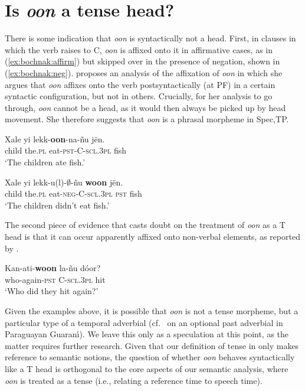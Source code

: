 \documentclass[output=paper,newtxmath,modfonts,nonflat,draftmode]{langsci/langscibook}
\begin{document}
\section{Is \textit{oon} a tense head?}\label{sec:bochnak:5}

There is some indication that \textit{oon} is syntactically not a
head. First, in clauses in which the verb raises to C, \textit{oon} is
affixed onto it in affirmative cases, as in (\ref{ex:bochnak:affirm}) but skipped over in the presence
of negation, shown in (\ref{ex:bochnak:neg}). \cite{Martinovic2015b, Martinovic2016a} proposes an
analysis of the affixation of \textit{oon} in which she argues that
\textit{oon} affixes onto
the verb postsyntactically (at PF) in a certain syntactic
configuration, but not in others. Crucially, for her analysis to go
through, \textit{oon} cannot be a head, as it would then always be
picked up by head movement. She therefore suggests that \textit{oon}
is a phrasal morpheme in Spec,TP.


  
\ea
\gll Xale yi lekk-\textbf{oon}-na-\~nu j\"en.\\
child the.\textsc{pl} eat-\textsc{pst-C-scl.3pl} fish\\
\glt `The children ate fish.'\label{ex:bochnak:affirm}
\z

\ea
\gll Xale yi lekk-{u(l)}-$\emptyset$-\~nu \textbf{woon} j\"en.\\
child the.\textsc{pl} eat-\textsc{neg-C-scl.3pl} \textsc{pst} fish\\
\glt `The children didn't eat fish.'\label{ex:bochnak:neg}
\z


The second piece of evidence that casts doubt on the treatment of 
\textit{oon} as a T head is that it can occur apparently affixed onto
non-verbal elements, as reported by \cite{torrence12clause}. 

\ea
\gll Kan-ati-\textbf{woon} la-\~nu d\'oor?\\
who-again-\textsc{pst} C-\textsc{scl.3pl} hit\\
\glt `Who did they hit again?'\hfill\citep[p.24]{torrence12clause}
\z

Given the examples above, it is possible that \textit{oon} is not a
tense morpheme, but a particular type of a temporal adverbial (cf.~\citealt{tonhauser06temporal} on an optional past adverbial in Paraguayan Guaran\'\i). We
leave this only as a speculation at this point, as the matter requires
further research. Given that our definition of tense in  only makes reference to semantic notions, the question of whether \textit{oon} behaves syntactically like a T head is orthogonal to the core aspects of our semantic analysis, where \textit{oon} is treated as a tense (i.e., relating a reference time to speech time).
\end{document}
